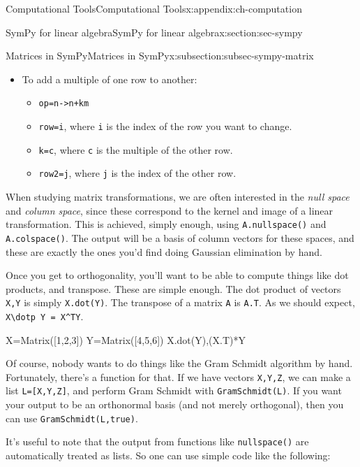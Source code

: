 \documentclass[oneside,10pt,]{book}
\newcommand{\mono}[1]{\texttt{#1}}
\numberwithin{equation}{section}
\begin{document}
\begin{appendixptx}{Computational Tools}{}{Computational Tools}{}{}{x:appendix:ch-computation}
\begin{sectionptx}{SymPy for linear algebra}{}{SymPy for linear algebra}{}{}{x:section:sec-sympy}
\begin{subsectionptx}{Matrices in SymPy}{}{Matrices in SymPy}{}{}{x:subsection:subsec-sympy-matrix}
\begin{itemize}[label=\textbullet]
\begin{itemize}[label=$\circ$]
\item{}\mono{op=\textquotesingle{}n->kn\textquotesingle{}}%
\item{}\mono{row=i}, where \mono{i} is the index of the row being rescaled.%
\item{}\mono{k=c}, where \mono{c} is the value of the scalar you want to multiply by.%
\end{itemize}
%
\item{}To add a multiple of one row to another:%
\begin{itemize}[label=$\circ$]
\item{}\mono{op=\textquotesingle{}n->n+km\textquotesingle{}}%
\item{}\mono{row=i}, where \mono{i} is the index of the row you want to change.%
\item{}\mono{k=c}, where \mono{c} is the multiple of the other row.%
\item{}\mono{row2=j}, where \mono{j} is the index of the other row.%
\end{itemize}
%
\end{itemize}
%
\par
When studying matrix transformations, we are often interested in the \emph{null space} and \emph{column space}, since these correspond to the kernel and image of a linear transformation. This is achieved, simply enough, using \mono{A.nullspace()} and \mono{A.colspace()}. The output will be a basis of column vectors for these spaces, and these are exactly the ones you'd find doing Gaussian elimination by hand.%
\par
Once you get to orthogonality, you'll want to be able to compute things like dot products, and transpose. These are simple enough. The dot product of vectors \mono{X,Y} is simply \mono{X.dot(Y)}. The transpose of a matrix \mono{A} is \mono{A.T}. As we should expect, \mono{X\textbackslash{}dotp Y = X\textasciicircum{}TY}.%
\begin{sageinput}
X=Matrix([1,2,3])
Y=Matrix([4,5,6])
X.dot(Y),(X.T)*Y
\end{sageinput}
Of course, nobody wants to do things like the Gram Schmidt algorithm by hand. Fortunately, there's a function for that. If we have vectors \mono{X,Y,Z}, we can make a list \mono{L=[X,Y,Z]}, and perform Gram Schmidt with \mono{GramSchmidt(L)}. If you want your output to be an orthonormal basis (and not merely orthogonal), then you can use \mono{GramSchmidt(L,true)}.%
\par
It's useful to note that the output from functions like \mono{nullspace()} are automatically treated as lists. So one can use simple code like the following:%

\end{subsectionptx}
\end{sectionptx}
\end{appendixptx}
\end{document}
